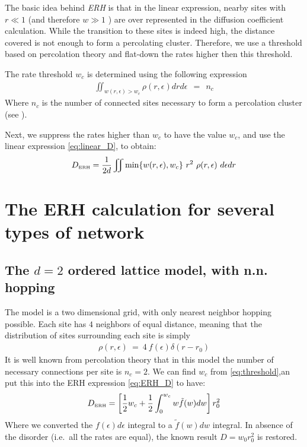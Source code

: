 The basic idea behind \emph{ERH} is that in the linear
expression, nearby sites 
with $r\ll 1$ (and therefore $w \gg 1$ ) are over represented in
the diffusion coefficient calculation. While the transition to
these sites is indeed high, the distance covered is not enough
to form a percolating cluster. Therefore, we use a threshold based
on percolation theory and flat-down the rates higher then this threshold.

The rate threshold $w_c$ is determined using the following expression
%
\begin{align}\label{eq:threshold}
\iint_{w(r,\epsilon)>w_c} \rho(r,\epsilon)drd\epsilon \ \ = \ \ n_c
\end{align}
%
Where $n_c$ is the number of connected sites necessary to form a percolation
cluster (see ).


Next, we suppress the rates higher than $w_c$ to have the value $w_c$,
and use the linear expression \ref{eq:linear_D}, to obtain:
%
\begin{align}\label{eq:ERH_D}
D_{\tbox{ERH}} = \frac{1}{2d}\iint \min\{w(r,\epsilon),w_c\} \ r^2  \ \rho(r,\epsilon) \ d\epsilon dr
\end{align}
%


\section{The ERH calculation for several types of network}
\subsection{The $d=2$ ordered lattice model, with n.n. hopping}

The model is a  two dimensional grid, with only nearest neighbor hopping possible. 
Each site has $4$ neighbors of equal distance, meaning that
the distribution of sites surrounding each site is simply
%
\begin{align}
\rho(r,\epsilon) \ = \ 4\ f(\epsilon)\delta(r-r_0) 
\end{align}
%
It is well known from percolation theory \cite{someonethatsaysthis} that in this model the number of necessary connections per site is $n_c=2$. We can
find $w_c$ from \ref{eq:threshold},an put this into the ERH 
expression \ref{eq:ERH_D} to have:
%
\begin{align}
D_{\mbox{\tiny ERH}} =  \left[\frac{1}{2}w_c + \frac{1}{2}\int_0^{w_c} w\tilde{f}(w) dw\right]r_0^2
\end{align}
%
Where we converted the $f(\epsilon)d\epsilon$ integral to a $\tilde{f}(w)dw$
integral. In absence of the disorder (i.e.\ all the rates are equal),
the known result $D = w_0r_0^2$ is restored.



